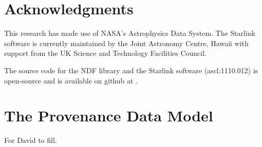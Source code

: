 \documentclass[final,authoryear,5p,times,twocolumn]{elsarticle}
\begin{document}
\section{Acknowledgments}

This research has made use of NASA's Astrophysics Data System.
The Starlink software is currently maintained by the Joint Astronomy
Centre, Hawaii with support from the UK Science and Technology
Facilities Council.

The source code for the NDF library and the Starlink software
(ascl:1110.012) is open-source and is available on github at
.


\appendix

\section{The Provenance Data Model}
\label{app:prov}

{\color{red} For David to fill.}

\end{document}
